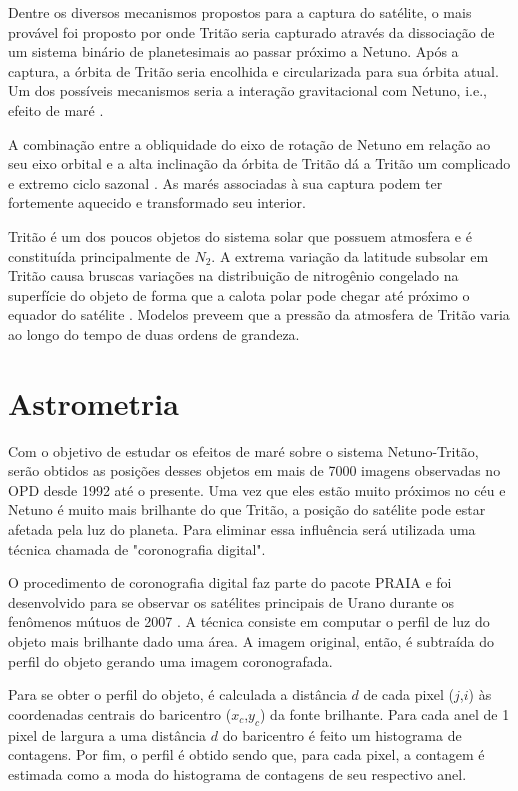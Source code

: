 \documentclass[12pt,a4paper]{monografia}
\begin{document}
Dentre os diversos mecanismos propostos para a captura do satélite, o mais provável foi proposto por \cite{Agnor2006} onde Tritão seria capturado através da dissociação de um sistema binário de planetesimais ao passar próximo a Netuno. Após a captura, a órbita de Tritão seria encolhida e circularizada para sua órbita atual. Um dos possíveis mecanismos seria a interação gravitacional com Netuno, i.e., efeito de maré \citep{Nogueira2011}.

A combinação entre a obliquidade do eixo de rotação de Netuno em relação ao seu eixo orbital e a alta inclinação da órbita de Tritão dá a Tritão um complicado e extremo ciclo sazonal \citep{McKinnon2007}. As marés associadas à sua captura podem ter fortemente aquecido e transformado seu interior.

Tritão é um dos poucos objetos do sistema solar que possuem atmosfera e é constituída principalmente de $N_{2}$. A extrema variação da latitude subsolar em Tritão causa bruscas variações na distribuição de nitrogênio congelado na superfície do objeto de forma que a calota polar pode chegar até próximo o equador do satélite \citep{Hansen1992}. Modelos preveem que a pressão da atmosfera de Tritão varia ao longo do tempo de duas ordens de grandeza.



\section{Astrometria}
\label{Sec: Netuno-astrometria}

\indent \indent Com o objetivo de estudar os efeitos de maré sobre o sistema Netuno-Tritão, serão obtidos as posições desses objetos em mais de 7000 imagens observadas no OPD desde 1992 até o presente. Uma vez que eles estão muito próximos no céu e Netuno é muito mais brilhante do que Tritão, a posição do satélite pode estar afetada pela luz do planeta. Para eliminar essa influência será utilizada uma técnica chamada de "coronografia digital".

O procedimento de coronografia digital faz parte do pacote PRAIA e foi desenvolvido para se observar os satélites principais de Urano durante os fenômenos mútuos de 2007 \citep{Assafin2009}. A técnica consiste em computar o perfil de luz do objeto mais brilhante dado uma área. A imagem original, então, é subtraída do perfil do objeto gerando uma imagem coronografada.

Para se obter o perfil do objeto, é calculada a distância $d$ de cada pixel ($j$,$i$) às coordenadas centrais do baricentro ($x_{c}$,$y_{c}$) da fonte brilhante. Para cada anel de 1 pixel de largura a uma distância $d$ do baricentro é feito um histograma de contagens. Por fim, o perfil é obtido sendo que, para cada pixel, a contagem é estimada como a moda do histograma de contagens de seu respectivo anel.
\end{document}
